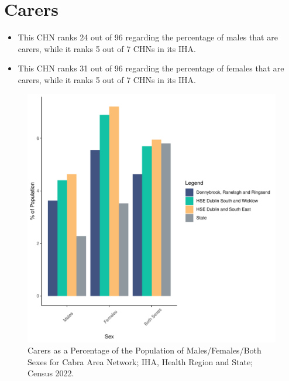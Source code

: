 \documentclass{article}
\begin{document}
\section{Carers}\label{sect:Carers}
\begin{itemize}
\item This CHN ranks  24 out of 96 regarding the percentage of males that are carers, while it ranks   5 out of 7 CHNs in its IHA.
\item This CHN ranks  31 out of 96 regarding the percentage of females that are carers, while it ranks   5 out of 7 CHNs in its IHA.
\end{itemize}
\begin{figure}[H]
	\centering
	\includegraphics[width = 150mm]{../figures/CareED.pdf}
	\caption{Carers as a Percentage of the Population of Males/Females/Both Sexes for Cabra Area Network; IHA, Health Region and State; Census 2022.}
	\label{fig:2ae19629-1a6a-13a3-e055-000000000001}
	\end{figure}
\end{document}
